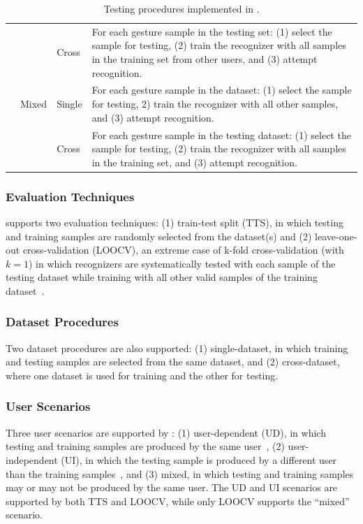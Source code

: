 \begin{table}
\begin{tabular}{lllp{6.9cm}}
                      \cmidrule{3-4}
              &       & Cross  & For each gesture sample in the testing set: (1) select the sample for testing, (2) train the recognizer with all samples in the training set from other users, and (3) attempt recognition. \\
              \cmidrule{2-4}
              & Mixed & Single & For each gesture sample in the dataset: (1) select the sample for testing, 2) train the recognizer with all other samples, and (3) attempt recognition. \\
                      \cmidrule{3-4}
              &       & Cross & For each gesture sample in the testing dataset: (1) select the sample for testing, (2) train the recognizer with all samples in the training set, and (3) attempt recognition. \\
      \bottomrule
  \end{tabular}
  \caption{Testing procedures implemented in \ql.}
  \label{tab:quantumleap-testing:testing-procedures}
\end{table}

\subsubsection{Evaluation Techniques} \label{sec:quantumleap-testing:description:testing-procedures:evaluation-techniques}
\ql supports two evaluation techniques: 
(1) train-test split (TTS), in which testing and training samples are randomly selected from the dataset(s) and 
(2) leave-one-out cross-validation (LOOCV), an extreme case of k-fold cross-validation (with $k{=}1$) in which recognizers are systematically tested with each sample of the testing dataset while training with all other valid samples of the training dataset~\cite{Zhou:2019}.

\subsubsection{Dataset Procedures} \label{sec:quantumleap-testing:description:testing-procedures:dataset-procedures}
Two dataset procedures are also supported: (1) single-dataset, in which training and testing samples are selected from the same dataset, and (2) cross-dataset, where one dataset is used for training and the other for testing. 

\subsubsection{User Scenarios} \label{sec:quantumleap-testing:description:testing-procedures:user-scenarios}
Three user scenarios are supported by \ql: (1) user-dependent (UD), in which testing and training samples are produced by the same user~\cite{Vatavu:2013}, (2) user-independent (UI), in which the testing sample is produced by a different user than the training samples~\cite{Vatavu:2013}, and (3) mixed, in which testing and training samples may or may not be produced by the same user. The UD and UI scenarios are supported by both TTS and LOOCV, while only LOOCV supports the ``mixed'' scenario.


